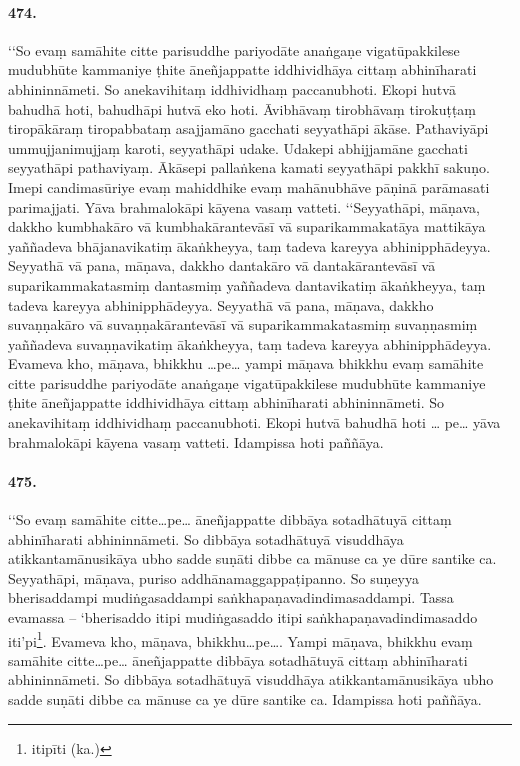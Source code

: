\paragraph{474.} ‘‘So evaṃ samāhite citte parisuddhe pariyodāte anaṅgaṇe vigatūpakkilese mudubhūte kammaniye ṭhite āneñjappatte iddhividhāya cittaṃ abhinīharati abhininnāmeti. So anekavihitaṃ iddhividhaṃ paccanubhoti. Ekopi hutvā bahudhā hoti, bahudhāpi hutvā eko hoti. Āvibhāvaṃ tirobhāvaṃ tirokuṭṭaṃ tiropākāraṃ tiropabbataṃ asajjamāno gacchati seyyathāpi ākāse. Pathaviyāpi ummujjanimujjaṃ karoti, seyyathāpi udake. Udakepi abhijjamāne gacchati seyyathāpi pathaviyaṃ. Ākāsepi pallaṅkena kamati seyyathāpi pakkhī sakuṇo. Imepi candimasūriye evaṃ mahiddhike evaṃ mahānubhāve pāṇinā parāmasati parimajjati. Yāva brahmalokāpi kāyena vasaṃ vatteti. ‘‘Seyyathāpi, māṇava, dakkho kumbhakāro vā kumbhakārantevāsī vā suparikammakatāya mattikāya yaññadeva bhājanavikatiṃ ākaṅkheyya, taṃ tadeva kareyya abhinipphādeyya. Seyyathā vā pana, māṇava, dakkho dantakāro vā dantakārantevāsī vā suparikammakatasmiṃ dantasmiṃ yaññadeva dantavikatiṃ ākaṅkheyya, taṃ tadeva kareyya abhinipphādeyya. Seyyathā vā pana, māṇava, dakkho suvaṇṇakāro vā suvaṇṇakārantevāsī vā suparikammakatasmiṃ suvaṇṇasmiṃ yaññadeva suvaṇṇavikatiṃ ākaṅkheyya, taṃ tadeva kareyya abhinipphādeyya. Evameva kho, māṇava, bhikkhu …pe… yampi māṇava bhikkhu evaṃ samāhite citte parisuddhe pariyodāte anaṅgaṇe vigatūpakkilese mudubhūte kammaniye ṭhite āneñjappatte iddhividhāya cittaṃ abhinīharati abhininnāmeti. So anekavihitaṃ iddhividhaṃ paccanubhoti. Ekopi hutvā bahudhā hoti … pe… yāva brahmalokāpi kāyena vasaṃ vatteti. Idampissa hoti paññāya.

\paragraph{475.} ‘‘So evaṃ samāhite citte…pe… āneñjappatte dibbāya sotadhātuyā cittaṃ abhinīharati abhininnāmeti. So dibbāya sotadhātuyā visuddhāya atikkantamānusikāya ubho sadde suṇāti dibbe ca mānuse ca ye dūre santike ca. Seyyathāpi, māṇava, puriso addhānamaggappaṭipanno. So suṇeyya bherisaddampi mudiṅgasaddampi saṅkhapaṇavadindimasaddampi. Tassa evamassa – ‘bherisaddo itipi mudiṅgasaddo itipi saṅkhapaṇavadindimasaddo iti’pi\footnote{itipīti (ka.)}. Evameva kho, māṇava, bhikkhu…pe…. Yampi māṇava, bhikkhu evaṃ samāhite citte…pe… āneñjappatte dibbāya sotadhātuyā cittaṃ abhinīharati abhininnāmeti. So dibbāya sotadhātuyā visuddhāya atikkantamānusikāya ubho sadde suṇāti dibbe ca mānuse ca ye dūre santike ca. Idampissa hoti paññāya.


